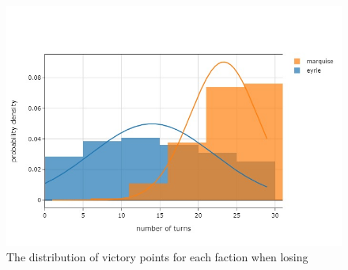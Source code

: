 \begin{figure}[h!]
    \begin{center}
      \includegraphics[width=\textwidth]{./images/fig-introductory-loser-vp-dist.jpeg}
    \end{center}
    \caption{The distribution of victory points for each faction when losing}
    \label{fig:introductory-loser-vp-dist}
\end{figure}



